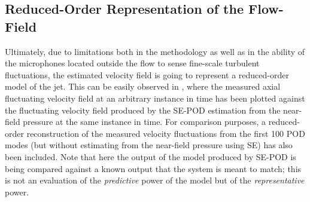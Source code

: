 \subsection{Reduced-Order Representation of the Flow-Field}
Ultimately, due to limitations both in the methodology as well as in the ability of the microphones located outside the flow to sense fine-scale turbulent fluctuations, the estimated velocity field is going to represent a reduced-order model of the jet.
This can be easily observed in , where the measured axial fluctuating velocity field at an arbitrary instance in time has been plotted against the fluctuating velocity field produced by the SE-POD estimation from the near-field pressure at the same instance in time.
For comparison purposes, a reduced-order reconstruction of the measured velocity fluctuations from the first 100 POD modes (but without estimating from the near-field pressure using SE) has also been included.
Note that here the output of the model produced by SE-POD is being compared against a known output that the system is meant to match; this is not an evaluation of the \textit{predictive} power of the model but of the \textit{representative} power.
